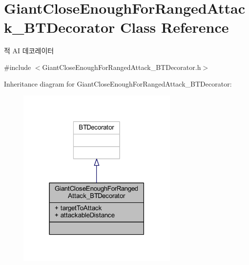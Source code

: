\hypertarget{class_giant_close_enough_for_ranged_attack___b_t_decorator}{}\section{Giant\+Close\+Enough\+For\+Ranged\+Attack\+\_\+\+B\+T\+Decorator Class Reference}
\label{class_giant_close_enough_for_ranged_attack___b_t_decorator}


적 AI 데코레이터  




{\ttfamily \#include $<$Giant\+Close\+Enough\+For\+Ranged\+Attack\+\_\+\+B\+T\+Decorator.\+h$>$}



Inheritance diagram for Giant\+Close\+Enough\+For\+Ranged\+Attack\+\_\+\+B\+T\+Decorator\+:\nopagebreak
\begin{figure}[H]
\begin{center}
\leavevmode
\includegraphics[width=225pt]{class_giant_close_enough_for_ranged_attack___b_t_decorator__inherit__graph}
\end{center}
\end{figure}



